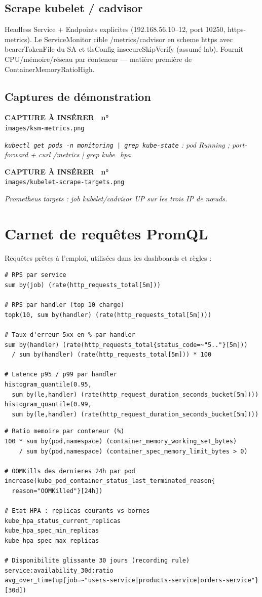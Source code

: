 \documentclass[12pt,a4paper]{article}
\newcounter{capturecount}
\newcommand{\capturebox}[2]{%
\par\vspace{4mm}
\begin{tcolorbox}[enhanced,colback=yellow!5,colframe=black!55,boxrule=0.7pt,
  borderline={0.7pt}{0pt}{black!40,dashed},
  arc=2mm,left=6pt,right=6pt,top=7pt,bottom=7pt]
\centering
{\normalsize\sffamily\bfseries CAPTURE À INSÉRER \textbar\ n°\,\stepcounter{capturecount}\thecapturecount}\\[3pt]
{\large\texttt{images/#2}}\\[7pt]
\begin{minipage}{0.94\linewidth}\centering\itshape #1\end{minipage}
\end{tcolorbox}
\par\vspace{2mm}}
\begin{document}
\subsection{Scrape kubelet / cadvisor}
Headless Service + Endpoints explicites (192.168.56.10--12, port 10250, https-metrics). Le ServiceMonitor cible /metrics/cadvisor en scheme https avec bearerTokenFile du SA et tlsConfig insecureSkipVerify (assumé lab). Fournit CPU/mémoire/réseau par conteneur --- matière première de ContainerMemoryRatioHigh.

\subsection{Captures de démonstration}
\capturebox{\texttt{kubectl get pods -n monitoring | grep kube-state} : pod Running ; port-forward + curl /metrics | grep kube\_hpa.}{ksm-metrics.png}

\capturebox{Prometheus targets : job kubelet/cadvisor UP sur les trois IP de nœuds.}{kubelet-scrape-targets.png}

\section{Carnet de requêtes PromQL}

Requêtes prêtes à l'emploi, utilisées dans les dashboards et règles :

\begin{lstlisting}[caption={Trafic et erreurs}]
# RPS par service
sum by(job) (rate(http_requests_total[5m]))

# RPS par handler (top 10 charge)
topk(10, sum by(handler) (rate(http_requests_total[5m])))

# Taux d'erreur 5xx en % par handler
sum by(handler) (rate(http_requests_total{status_code=~"5.."}[5m]))
  / sum by(handler) (rate(http_requests_total[5m])) * 100

# Latence p95 / p99 par handler
histogram_quantile(0.95,
  sum by(le,handler) (rate(http_request_duration_seconds_bucket[5m])))
histogram_quantile(0.99,
  sum by(le,handler) (rate(http_request_duration_seconds_bucket[5m])))
\end{lstlisting}

\begin{lstlisting}[caption={Ressources et plateforme}]
# Ratio memoire par conteneur (%)
100 * sum by(pod,namespace) (container_memory_working_set_bytes)
    / sum by(pod,namespace) (container_spec_memory_limit_bytes > 0)

# OOMKills des dernieres 24h par pod
increase(kube_pod_container_status_last_terminated_reason{
  reason="OOMKilled"}[24h])

# Etat HPA : replicas courants vs bornes
kube_hpa_status_current_replicas
kube_hpa_spec_min_replicas
kube_hpa_spec_max_replicas

# Disponibilite glissante 30 jours (recording rule)
service:availability_30d:ratio
avg_over_time(up{job=~"users-service|products-service|orders-service"}[30d])
\end{lstlisting}
\end{document}
